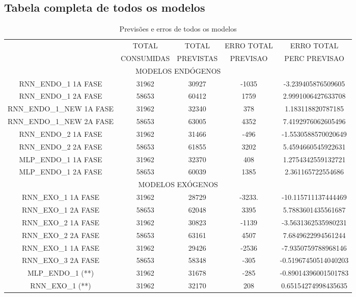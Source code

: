 \documentclass[	12pt, Times, openright, twoside, a4paper, english, brazil]{abntex2}
\begin{document}
        \subsection{Tabela completa de todos os modelos}
        
     
        \begin{table}[!ht]
        \caption{Previsões e erros de todos os modelos}
        \begin{adjustbox}{width=\columnwidth,center}
           \begin{tabular}{ | c | c| c | c| c | }
     \rowcolor{gray!50}
    \multirow{2}{*}{	MODELO} & TOTAL  & TOTAL  & ERRO TOTAL & ERRO TOTAL  \\ \rowcolor{gray!50}
   &                        CONSUMIDAS & PREVISTAS &  PREVISAO &  PERC PREVISAO  \\ 
    \multicolumn{5}{c}{	MODELOS ENDÓGENOS }  \\ \hline
	RNN\_ENDO\_1 1A FASE & 31962 & 30927 & -1035 & -3.239405876509605 \\ \hline
	RNN\_ENDO\_1 2A FASE & 58653 & 60412 & 1759 & 2.9991006427633708 \\ \hline
	RNN\_ENDO\_1\_NEW 1A FASE & 31962 & 32340 & 378 & 1.183118820787185 \\ \hline
	RNN\_ENDO\_1\_NEW 2A FASE & 58653 & 63005& 4352 & 7.4192976062605496 \\ \hline
	RNN\_ENDO\_2 1A FASE & 31962 & 31466 & -496 & -1.5530588570020649 \\ \hline
	RNN\_ENDO\_2 2A FASE & 58653 & 61855 & 3202 & 5.4594660545922631 \\ \hline
	MLP\_ENDO\_1 1A FASE & 31962 & 32370 & 408 & 1.2754342559132721 \\ \hline
	MLP\_ENDO\_1 2A FASE & 58653 & 60039 & 1385 & 2.361165722554686 \\ \hline
	\multicolumn{5}{c}{ MODELOS EXÓGENOS }\\ \hline
	RNN\_EXO\_1 1A FASE & 31962 & 28729 & -3233. & -10.115711137444469 \\ \hline
	RNN\_EXO\_1 2A FASE & 58653 & 62048 & 3395 & 5.7883601435561687 \\ \hline
	RNN\_EXO\_2 1A FASE & 31962 & 30823 & -1139& -3.5631362535980231 \\ \hline
	RNN\_EXO\_2 2A FASE & 58653 & 63161 & 4507 & 7.6849622994561244 \\ \hline
	RNN\_EXO\_1 1A FASE & 31962 & 29426 & -2536 & -7.9350759788968146 \\ \hline
	RNN\_EXO\_3 2A FASE & 58653 & 58348 & -305 & -0.51967450514040203 \\ \hline
	MLP\_ENDO\_1 (**) & 31962 & 31678 & -285 & -0.89014396001501783 \\ \hline
	RNN\_EXO\_1 (**) & 31962 & 32170 & 208 & 0.65154274998435635 \\ \hline
\end{tabular} \end{adjustbox} \end{table} 
\end{document}

